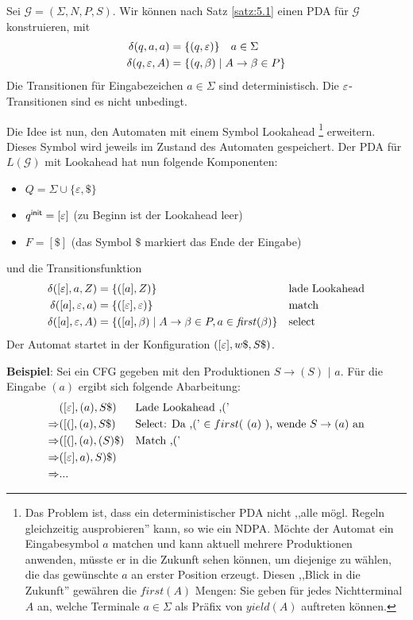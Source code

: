 {Sei $\mathcal{G} = (\Sigma, N, P, S)$.
Wir können nach Satz \ref{satz:5.1} einen \ac{PDA} für $\mathcal{G}$ konstruieren, mit
\begin{align*}
  \delta(q, a, a) &= \{(q, \varepsilon)\} \quad a \in \Sigma \\
  \delta(q, \varepsilon, A) &= \{(q, \beta)  \mid A \to \beta \in P\}
\end{align*}
Die Transitionen für Eingabezeichen $a \in \Sigma$ sind deterministisch.
Die $\varepsilon$-Transitionen sind es nicht unbedingt.

Die Idee ist nun, den Automaten mit einem Symbol Lookahead \footnote{Das Problem ist, dass ein deterministischer \ac{PDA} nicht ,,alle mögl. Regeln gleichzeitig ausprobieren'' kann, so wie ein NDPA. Möchte der Automat ein Eingabesymbol $a$ matchen und kann aktuell mehrere Produktionen anwenden, müsste er in die Zukunft sehen können, um diejenige zu wählen, die das gewünschte $a$ an erster Position erzeugt. Diesen ,,Blick in die Zukunft'' gewähren die $first(A)$ Mengen: Sie geben für jedes Nichtterminal $A$ an, welche Terminale $a \in \Sigma$ als Präfix von $yield(A)$ auftreten können.} 
erweitern. Dieses Symbol wird jeweils im Zustand des Automaten
gespeichert. Der \ac{PDA} für $L (\mathcal{G})$ mit Lookahead hat nun
folgende Komponenten:
\begin{itemize}
\item $Q = \Sigma\cup \{\varepsilon, \$\}$
\item $q^\mathsf{init} = [\varepsilon]$ (zu Beginn ist der Lookahead leer)
\item $F = [\$]$  (das Symbol $\$$ markiert das Ende der Eingabe)
\end{itemize}
und die Transitionsfunktion
\begin{align*}
  \delta ([\varepsilon], a, Z) & = \{([a], Z) \} & & \text{lade Lookahead} \\
  \delta ([a], \varepsilon, a) & = \{([\varepsilon], \varepsilon) \} && \text{match}
  \\
  \delta ([a], \varepsilon, A) & = \{([a], \beta) \mid A\to\beta\in P, a \in
  \mathit{first} (\beta) \} && \text{select}
\end{align*}
Der Automat startet in der Konfiguration $([\varepsilon], w\$, S\$)$.

\textbf{Beispiel}: Sei ein \ac{CFG} gegeben mit den Produktionen $S \to ( S )$ $ |$ $ a$. Für die Eingabe $(a)$ ergibt sich folgende Abarbeitung:
\begin{align*}
              & ([\varepsilon], (a), S\$ )   && \text{Lade Lookahead ,('}\\
  \Rightarrow & ([(], (a), S\$ )   && \text{Select: Da ,(' $\in first($ $(a)$ $ )$, wende $S \to (a)$ an}\\
  \Rightarrow & ([(], (a), (S)\$ ) && \text{Match ,('}\\
  \Rightarrow & ([\varepsilon], a), S)\$) \\
  \Rightarrow & ...
\end{align*}

}

